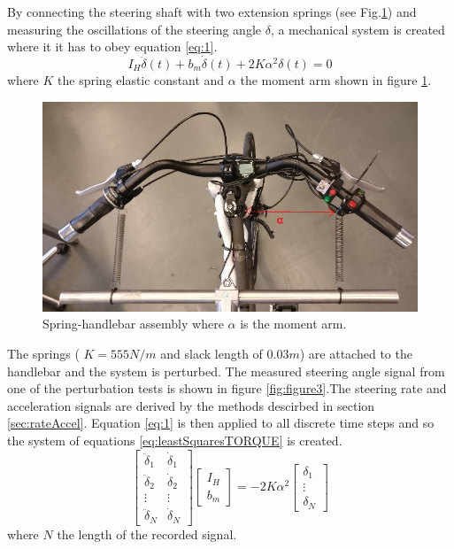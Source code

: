 By connecting the steering shaft with two extension springs (see Fig.\ref{fig:figure1}) and measuring the oscillations of the steering angle \ensuremath{\delta}, a mechanical system is created where it it has to obey equation \ref{eq:1}.
\begin{equation}
    I_H\ddot{\delta}\left(t\right)+b_m\dot{\delta}\left(t\right)+2K\alpha^2\delta\left(t\right)=0
    \label{eq:1}
\end{equation}
where \ensuremath{K} the spring elastic constant and \ensuremath{\alpha} the moment arm shown in figure \ref{fig:figure1}. 
\begin{figure}[h]
\centering
\captionsetup{justification=centering,margin=2cm}
\includegraphics[scale=0.9]{images/figure1.png}
	\caption[Short title]{Spring-handlebar assembly  where \ensuremath{\alpha}  is the moment arm.}
\label{fig:figure1}
\end{figure}

 The springs ( \ensuremath{K=555 N/m} and slack length of \ensuremath{ 0.03m}) are attached to the handlebar and the system is perturbed. The measured steering angle signal from one of the perturbation tests is shown in figure \ref{fig:figure3}.The steering rate and acceleration signals are derived by the methods descirbed in section \ref{sec:rateAccel}. Equation \ref{eq:1} is then applied to all discrete time steps and so the system of equations \ref{eq:leastSquaresTORQUE} is created.
 \begin{equation}
     \begin{bmatrix}
         \ddot{\delta}_1 & \dot{\delta}_1   \\ \ddot{\delta}_2 & \dot{\delta}_2 \\ \vdots & \vdots \\ \ddot{\delta}_N & \dot{\delta}_N 
     \end{bmatrix} \begin{bmatrix}
         I_H \\ b_m
     \end{bmatrix} = -2K\alpha^2 \begin{bmatrix}
         \delta_1 \\ \vdots \\ \delta_N
     \end{bmatrix}
     \label{eq:leastSquaresTORQUE}
 \end{equation}
where \ensuremath{N} the length of the recorded signal.

